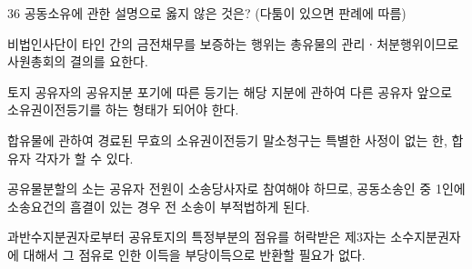 \begin{question}{36}
공동소유에 관한 설명으로 옳지 않은 것은? (다툼이 있으면 판례에 따름)
\begin{choices}
  \item 비법인사단이 타인 간의 금전채무를 보증하는 행위는 총유물의 관리ㆍ처분행위이므로 사원총회의 결의를 요한다.
  \item 토지 공유자의 공유지분 포기에 따른 등기는 해당 지분에 관하여 다른 공유자 앞으로 소유권이전등기를 하는 형태가 되어야 한다.
  \item 합유물에 관하여 경료된 무효의 소유권이전등기 말소청구는 특별한 사정이 없는 한, 합유자 각자가 할 수 있다.
  \item 공유물분할의 소는 공유자 전원이 소송당사자로 참여해야 하므로, 공동소송인 중 1인에 소송요건의 흠결이 있는 경우 전 소송이 부적법하게 된다.
  \item 과반수지분권자로부터 공유토지의 특정부분의 점유를 허락받은 제3자는 소수지분권자에 대해서 그 점유로 인한 이득을 부당이득으로 반환할 필요가 없다.
\end{choices}
\end{question}
